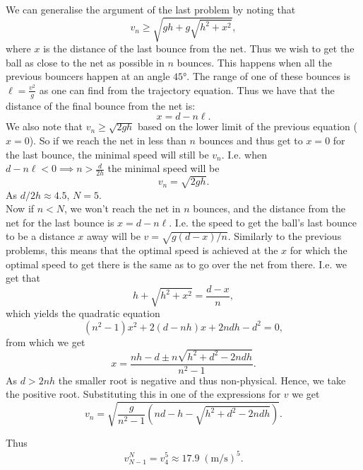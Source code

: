 \begin{solution}
We can generalise the argument of the last problem by noting that
\[v_n\geq\sqrt{gh+g\sqrt{h^2+x^2}},\]
where $x$ is the distance of the last bounce from the net. Thus we wish to get the ball as close to the net as possible in $n$ bounces. This happens when all the previous bouncers happen at an angle $\ang{45}$. The range of one of these bounces is $\ell=\frac{v^2}{g}$ as one can find from the trajectory equation. Thus we have that the distance of the final bounce from the net is:
\[x=d-n\ell.\]
We also note that $v_n\geq \sqrt{2gh}$ based on the lower limit of the previous equation ($x=0$). So if we reach the net in less than $n$ bounces and thus get to $x=0$ for the last bounce, the minimal speed will still be $v_n$. I.e. when $d-n\ell < 0 \implies n>\frac{d}{2h}$ the minimal speed will be
\[v_n=\sqrt{2gh}.\]
As $d/2h\approx 4.5$, $N=5.$\\

Now if $n<N$, we won't reach the net in $n$ bounces, and the distance from the net for the last bounce is $x=d-n\ell.$ I.e. the speed to get the ball's last bounce to be a distance $x$ away will be $v=\sqrt{g(d-x)/n}.$ Similarly to the previous problems, this means that the optimal speed is achieved at the $x$ for which the optimal speed to get there is the same as to go over the net from there. I.e. we get that
\[h+\sqrt{h^2+x^2}=\frac{d-x}{n},\]
which yields the quadratic equation
\[(n^2-1)x^2+2(d-nh)x+2ndh-d^2=0,\]
from which we get
\[x=\frac{nh-d\pm n\sqrt{h^2+d^2-2ndh}}{n^2-1}.\]
As $d>2nh$ the smaller root is negative and thus non-physical. Hence, we take the positive root. Substituting this in one of the expressions for $v$ we get
\[v_n=\sqrt{\frac{g}{n^2-1}\left(nd-h-\sqrt{h^2+d^2-2ndh}\right)}.\]

Thus
\[v_{N-1}^N=v_4^5\approx\boxed{17.9\;(\mathrm{m/s})^5.}\]
\end{solution}